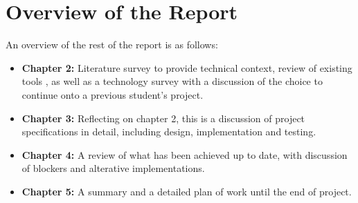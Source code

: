 \section{Overview of the Report}
An overview of the rest of the report is as follows: 

\begin{itemize}
    \item \textbf{Chapter 2:} Literature survey to provide technical context, review of existing tools , as well as a technology survey with a discussion of the choice to continue  onto a previous student's project.  
    \item \textbf{Chapter 3:} Reflecting on chapter 2, this is a discussion of project specifications in detail, including design, implementation and testing. 
    \item \textbf{Chapter 4:} A review of what has been achieved up to date, with discussion of blockers and alterative implementations. 
    \item \textbf{Chapter 5:} A summary and a detailed plan of work until the end of project. 
\end{itemize}